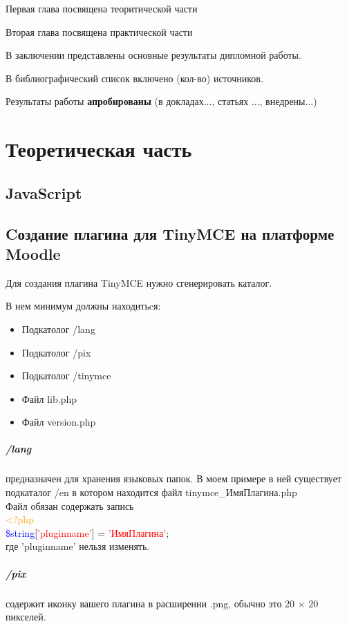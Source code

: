\documentclass[14pt,Diplom]{diplomwork}
\begin{document}
Первая глава посвящена теоритической части

Вторая глава посвящена практической части


В заключении представлены основные результаты дипломной работы.

В библиографический список включено (кол-во) источников.


Результаты работы \textbf{апробированы} (в докладах..., статьях ..., внедрены...)


\chapter{Теоретическая часть}

\section{JavaScript}

\section{Cоздание плагина для TinyMCE на платформе Moodle}
Для создания плагина TinyMCE нужно сгенерировать каталог.

В нем минимум должны находитьcя:

\begin{itemize}
	\item Подкатолог /lang
	\item Подкатолог /pix
	\item Подкатолог /tinymce
	\item Файл lib.php
	\item Файл version.php
\end{itemize}

\paragraph{/lang}
 предназначен для хранения языковых папок. В моем примере в ней существует подкаталог /en в котором находится файл tinymce\_ИмяПлагина.php\\
 Файл обязан содержать запись\\
  \textcolor{orange}{<?php} \\
  \textcolor{blue}{\$string}[\textcolor{red}{'pluginname'}] = \textcolor{red}{'ИмяПлагина'};\\
  где 'pluginname' нельзя изменять.

\paragraph{/pix}
содержит иконку вашего плагина в расширении .png, обычно это 20 $\times$ 20 пикселей.
\end{document}
